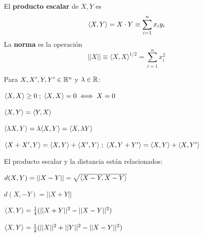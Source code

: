  El \textbf{producto escalar} de $X,Y$ es
$$\langle X,Y \rangle = X\cdot Y \equiv \sum_{i = 1}^nx_iy_i$$
La \textbf{norma} es la operación 
$$||X||\equiv \langle X,X \rangle^{1/2} = \sum_{i = 1}^nx_i^2$$

 Para $X,X',Y,Y' \in \mathbb{R}^n$ y $\lambda \in \mathbb{R}$:
\begin{itemizex}
	\item $\langle X,X \rangle \ge 0 \; ;\; \langle X,X \rangle = 0 \iff X = 0$
	\item $\langle X,Y \rangle = \langle Y,X \rangle$
	\item $\langle \lambda X, Y \rangle = \lambda \langle X,Y \rangle = \langle X, \lambda Y \rangle$
	\item $\langle X+X' , Y \rangle = \langle X,Y \rangle+\langle X',Y \rangle\;;\;
	\langle X , Y+Y' \rangle = \langle X,Y \rangle+\langle X,Y' \rangle$
\end{itemizex}

 El producto escalar y la distancia están relacionados:
\begin{itemizex}
	\item $d(X,Y) = ||X-Y|| = \sqrt{\langle X-Y,X-Y \rangle}$
	\item $d(X,-Y) = ||X+Y||$
	\item $\langle  X, Y \rangle = \frac{1}{4}(||X+Y||^2 - ||X-Y||^2)$
	\item $\langle X, Y \rangle = \frac{1}{2}(||X||^2 + ||Y||^2 - ||X-Y||^2)$
\end{itemizex}

